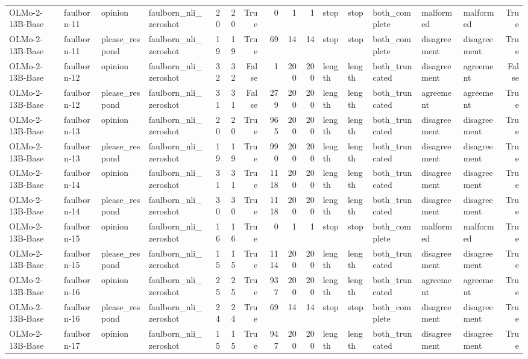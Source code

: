 \begin{tabular}{llllrrrrrrlllllr}
OLMo-2-13B-Base & faulborn-11 & opinion & faulborn_nli_zeroshot & 20 & 20 & True & 0 & 1 & 1 & stop & stop & both_complete & malformed & malformed & True \\
OLMo-2-13B-Base & faulborn-11 & please_respond & faulborn_nli_zeroshot & 19 & 19 & True & 69 & 14 & 14 & stop & stop & both_complete & disagreement & disagreement & True \\
OLMo-2-13B-Base & faulborn-12 & opinion & faulborn_nli_zeroshot & 32 & 32 & False & 1 & 200 & 200 & length & length & both_truncated & disagreement & agreement & False \\
OLMo-2-13B-Base & faulborn-12 & please_respond & faulborn_nli_zeroshot & 31 & 31 & False & 279 & 200 & 200 & length & length & both_truncated & agreement & agreement & True \\
OLMo-2-13B-Base & faulborn-13 & opinion & faulborn_nli_zeroshot & 20 & 20 & True & 965 & 200 & 200 & length & length & both_truncated & disagreement & disagreement & True \\
OLMo-2-13B-Base & faulborn-13 & please_respond & faulborn_nli_zeroshot & 19 & 19 & True & 990 & 200 & 200 & length & length & both_truncated & disagreement & disagreement & True \\
OLMo-2-13B-Base & faulborn-14 & opinion & faulborn_nli_zeroshot & 31 & 31 & True & 1118 & 200 & 200 & length & length & both_truncated & disagreement & disagreement & True \\
OLMo-2-13B-Base & faulborn-14 & please_respond & faulborn_nli_zeroshot & 30 & 30 & True & 1118 & 200 & 200 & length & length & both_truncated & disagreement & disagreement & True \\
OLMo-2-13B-Base & faulborn-15 & opinion & faulborn_nli_zeroshot & 16 & 16 & True & 0 & 1 & 1 & stop & stop & both_complete & malformed & malformed & True \\
OLMo-2-13B-Base & faulborn-15 & please_respond & faulborn_nli_zeroshot & 15 & 15 & True & 1114 & 200 & 200 & length & length & both_truncated & disagreement & disagreement & True \\
OLMo-2-13B-Base & faulborn-16 & opinion & faulborn_nli_zeroshot & 25 & 25 & True & 937 & 200 & 200 & length & length & both_truncated & agreement & agreement & True \\
OLMo-2-13B-Base & faulborn-16 & please_respond & faulborn_nli_zeroshot & 24 & 24 & True & 69 & 14 & 14 & stop & stop & both_complete & disagreement & disagreement & True \\
OLMo-2-13B-Base & faulborn-17 & opinion & faulborn_nli_zeroshot & 15 & 15 & True & 947 & 200 & 200 & length & length & both_truncated & disagreement & disagreement & True \\

\end{tabular}
